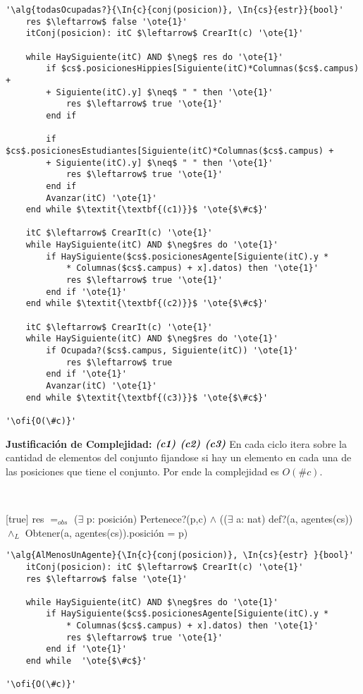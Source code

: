 \begin{lstlisting}[mathescape]
'\alg{todasOcupadas?}{\In{c}{conj(posicion)}, \In{cs}{estr}}{bool}'
	res $\leftarrow$ false '\ote{1}'
	itConj(posicion): itC $\leftarrow$ CrearIt(c) '\ote{1}'

	while HaySiguiente(itC) AND $\neg$ res do '\ote{1}'
		if $cs$.posicionesHippies[Siguiente(itC)*Columnas($cs$.campus) +
		+ Siguiente(itC).y] $\neq$ " " then '\ote{1}'
			res $\leftarrow$ true '\ote{1}'
		end if

		if $cs$.posicionesEstudiantes[Siguiente(itC)*Columnas($cs$.campus) +
		+ Siguiente(itC).y] $\neq$ " " then '\ote{1}'
			res $\leftarrow$ true '\ote{1}'
		end if
		Avanzar(itC) '\ote{1}'
	end while $\textit{\textbf{(c1)}}$ '\ote{$\#c$}'

	itC $\leftarrow$ CrearIt(c) '\ote{1}'
	while HaySiguiente(itC) AND $\neg$res do '\ote{1}'
		if HaySiguiente($cs$.posicionesAgente[Siguiente(itC).y *
			* Columnas($cs$.campus) + x].datos) then '\ote{1}'
			res $\leftarrow$ true '\ote{1}'
		end if '\ote{1}'
	end while $\textit{\textbf{(c2)}}$ '\ote{$\#c$}'

	itC $\leftarrow$ CrearIt(c) '\ote{1}'
	while HaySiguiente(itC) AND $\neg$res do '\ote{1}'
		if Ocupada?($cs$.campus, Siguiente(itC)) '\ote{1}'
			res $\leftarrow$ true
		end if '\ote{1}'
		Avanzar(itC) '\ote{1}'
	end while $\textit{\textbf{(c3)}}$ '\ote{$\#c$}'

'\ofi{O(\#c)}'
\end{lstlisting}

\textbf{Justificación de Complejidad:} $\textit{\textbf{(c1)}}$ $\textit{\textbf{(c2)}}$ $\textit{\textbf{(c3)}}$ En cada ciclo itera sobre la cantidad de elementos del conjunto fijandose si hay un elemento en cada una de las posiciones que tiene el conjunto. Por ende la complejidad es $O(\#c)$.

~


[true]
{res $=_{obs}$ ($\exists$ p: posición) Pertenece?(p,c) $\land$ (($\exists$ a: nat) def?(a, agentes(cs)) $\land_L$ Obtener(a, agentes(cs)).posición = p)}

\begin{lstlisting}[mathescape]
'\alg{AlMenosUnAgente}{\In{c}{conj(posicion)}, \In{cs}{estr} }{bool}'
	itConj(posicion): itC $\leftarrow$ CrearIt(c) '\ote{1}'
	res $\leftarrow$ false '\ote{1}'

	while HaySiguiente(itC) AND $\neg$res do '\ote{1}'
		if HaySiguiente($cs$.posicionesAgente[Siguiente(itC).y *
			* Columnas($cs$.campus) + x].datos)	then '\ote{1}'
			res $\leftarrow$ true '\ote{1}'
		end if '\ote{1}'
	end while  '\ote{$\#c$}'

'\ofi{O(\#c)}'
\end{lstlisting}

